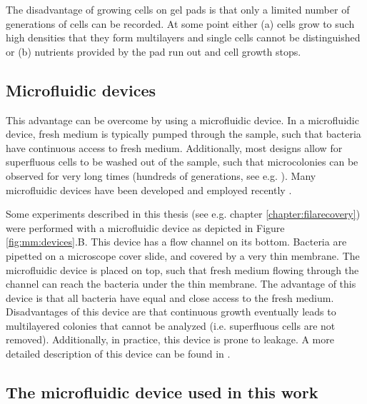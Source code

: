 The disadvantage of growing cells on gel pads is that only a limited number of generations of cells can be recorded.
At some point either (a) cells grow to such high densities that they form multilayers and single cells cannot be distinguished or (b) nutrients provided by the pad run out and cell growth stops.

\subsection{Microfluidic devices}

This advantage can be overcome by using a microfluidic device.
In a microfluidic device, fresh medium is typically pumped through the sample, such that bacteria have continuous access to fresh medium. Additionally, most designs allow for superfluous cells to be washed out of the sample, such that microcolonies can be observed for very long times (hundreds of generations, see e.g. \cite{Wang2010}).
%
Many microfluidic devices have been developed and employed recently \cite{Locke2009, Hammar2014, Hansen2015, Bennett2010, Nanatani2015, Hashimoto2016, Lambert2014, Ullman2013, Young2013, Ferry2011, Wang2010}.

Some experiments described in this thesis (see e.g. chapter \ref{chapter:filarecovery}) were performed with a microfluidic device as depicted in Figure \ref{fig:mm:devices}.B.
This device has a flow channel on its bottom. Bacteria are pipetted on a microscope cover slide, and covered by a very thin membrane. The microfluidic device is placed on top, such that fresh medium flowing through the channel can reach the bacteria under the thin membrane.
The advantage of this device is that all bacteria have equal and close access to the fresh medium. Disadvantages of this device are that continuous growth eventually leads to multilayered colonies that cannot be analyzed (i.e. superfluous cells are not removed).
Additionally, in practice, this device is prone to leakage.
A more detailed description of this device can be found in \cite{Boulineau2013}.

\subsection{The microfluidic device used in this work}

% 

